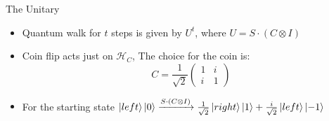 \documentclass[10pt]{beamer}
\newcommand{\Hi}{\mathcal{H}}
\begin{document}
\begin{frame}{The Unitary}
    \begin{itemize}
        \item Quantum walk for $t$ steps is given by $U^t$, where $U = S \cdot (C \otimes I)$
        \item Coin flip acts just on $\Hi_C$, The choice for the coin is:
        \begin{equation*}
            C = \frac{1}{\sqrt{2}}
            \begin{pmatrix}
            1 & i \\
            i & 1
            \end{pmatrix}
        \end{equation*}
     \item For the starting state $\ket{left}\ket{0} \xrightarrow{S \cdot (C\otimes I)} \frac{1}{\sqrt{2}}\ket{right}\ket{1} + \frac{i}{\sqrt{2}} \ket{left}\ket{-1}$
    \end{itemize}
\end{frame}
\end{document}
